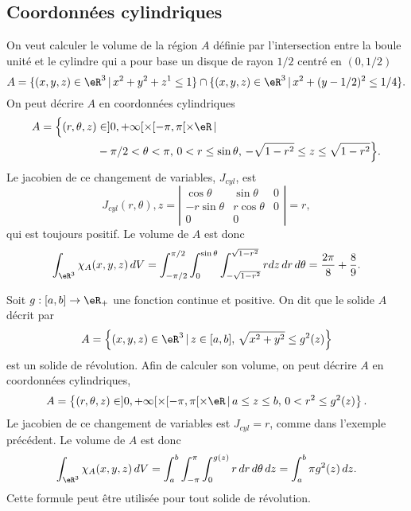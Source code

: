 \subsection{Coordonnées cylindriques}

\begin{example}
	On veut calculer le volume de la région \( A\) définie par  l'intersection entre la boule unité et le cylindre qui a pour base un disque de rayon \( 1/2\) centré en \( (0, 1/2)\)
	\[
		A=\{(x,y,z) \in\eR^3 \,\vert\, x^2+y^2+z^1\leq 1\}\cap\{(x,y,z) \in \eR^3\,\vert\, x^2+(y-1/2)^2\leq 1/4\}.
	\]
	On peut décrire \( A\) en coordonnées cylindriques
	\begin{equation}
		\begin{aligned}
			A=\Big\{(r,\theta,z) & \in ]0, +\infty[\times [-\pi,\pi[\times \eR\,\vert\,                                     \\
			                     & -\pi/2<\theta<\pi, \, 0<r\leq \sin\theta, \, -\sqrt{1-r^2}\leq z\leq\sqrt{1-r^2} \Big\}.
		\end{aligned}
	\end{equation}
	Le jacobien de ce changement de variables,  \( J_{cyl}\), est
	\begin{equation}
		J_{cyl}(r, \theta), z= \left\vert\begin{array}{ccc}
			\cos \theta   & \sin \theta  & 0 \\
			-r\sin \theta & r\cos \theta & 0 \\
			0             & 0            &
		\end{array}\right\vert= r,
	\end{equation}
	qui est toujours positif. Le volume de \( A\) est donc
	\[
		\int_{\eR^3}\chi_{A}(x,y,z)\, dV=\int_{-\pi/2}^{\pi/2}\int_0^{\sin\theta}\int_{-\sqrt{1-r^2}}^{\sqrt{1-r^2}} r dz\,dr\,d\theta=\frac{2\pi}{8}+\frac{8}{9}.
	\]
\end{example}

\begin{example}
	Soit \( g:[a,b]\to\eR_+\) une fonction continue et positive. On dit que le solide \( A\) décrit par
	\[
		A=\left\{(x,y,z)\in\eR^3\, \vert \, z\in[a,b], \,\sqrt{x^2+y^2}\leq g^2(z) \right\}
	\]
	est un solide de révolution. Afin de calculer son volume, on peut décrire \( A\) en coordonnées cylindriques,
	\[
		A=\left\{(r,\theta,z) \in ]0, +\infty[\times [-\pi,\pi[\times \eR\,\vert\, a\leq z\leq b, \, 0<r^2\leq g^2(z) \right\}.
	\]
	Le jacobien de ce changement de variables est  \( J_{cyl}=r\), comme dans l'exemple précédent. Le volume de \( A\) est donc
	\[
		\int_{\eR^3}\chi_{A}(x,y,z)\, dV=\int_a^{b}\int_{-\pi}^{\pi}\int_{0}^{g(z)} r  \,dr\,d\theta\, dz=\int_a^{b} \pi g^2(z) \, dz.
	\]
	Cette formule peut être utilisée pour tout solide de révolution.
\end{example}

